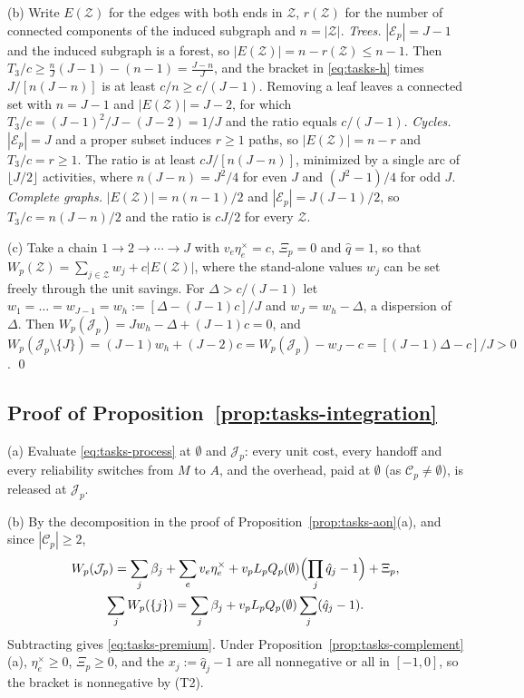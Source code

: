 (b) Write $E(\mathcal Z)$ for the edges with both ends in $\mathcal Z$, $r(\mathcal Z)$ for the number of connected components of the induced subgraph and $n=|\mathcal Z|$. \emph{Trees.} $|\mathcal E_p|=J-1$ and the induced subgraph is a forest, so $|E(\mathcal Z)|=n-r(\mathcal Z)\le n-1$. Then $T_3/c\ge\frac nJ(J-1)-(n-1)=\frac{J-n}J$, and the bracket in \eqref{eq:tasks-h} times $J/[n(J-n)]$ is at least $c/n\ge c/(J-1)$. Removing a leaf leaves a connected set with $n=J-1$ and $|E(\mathcal Z)|=J-2$, for which $T_3/c=(J-1)^2/J-(J-2)=1/J$ and the ratio equals $c/(J-1)$. \emph{Cycles.} $|\mathcal E_p|=J$ and a proper subset induces $r\ge 1$ paths, so $|E(\mathcal Z)|=n-r$ and $T_3/c=r\ge 1$. The ratio is at least $cJ/[n(J-n)]$, minimized by a single arc of $\lfloor J/2\rfloor$ activities, where $n(J-n)=J^2/4$ for even $J$ and $(J^2-1)/4$ for odd $J$. \emph{Complete graphs.} $|E(\mathcal Z)|=n(n-1)/2$ and $|\mathcal E_p|=J(J-1)/2$, so $T_3/c=n(J-n)/2$ and the ratio is $cJ/2$ for every $\mathcal Z$.

(c) Take a chain $1\to 2\to\cdots\to J$ with $v_e\eta^\times_e=c$, $\Xi_p=0$ and $\hat q=1$, so that $W_p(\mathcal Z)=\sum_{j\in\mathcal Z}w_j+c|E(\mathcal Z)|$, where the stand-alone values $w_j$ can be set freely through the unit savings. For $\Delta>c/(J-1)$ let $w_1=\dots=w_{J-1}=w_h:=[\Delta-(J-1)c]/J$ and $w_J=w_h-\Delta$, a dispersion of $\Delta$. Then $W_p(\mathcal J_p)=Jw_h-\Delta+(J-1)c=0$, and $W_p(\mathcal J_p\setminus\{J\})=(J-1)w_h+(J-2)c=W_p(\mathcal J_p)-w_J-c=[(J-1)\Delta-c]/J>0$. \qed

\subsection*{Proof of Proposition~\ref{prop:tasks-integration}}

(a) Evaluate \eqref{eq:tasks-process} at $\emptyset$ and $\mathcal J_p$: every unit cost, every handoff and every reliability switches from $M$ to $A$, and the overhead, paid at $\emptyset$ (as $\mathcal C_p\ne\emptyset$), is released at $\mathcal J_p$.

(b) By the decomposition in the proof of Proposition~\ref{prop:tasks-aon}(a), and since $|\mathcal C_p|\ge 2$,
\begin{gather*}
W_p(\mathcal J_p)=\sum_j\beta_j+\sum_ev_e\eta^\times_e+v_pL_pQ_p(\emptyset)\Bigl(\prod_j\hat q_j-1\Bigr)+\Xi_p,\\
\sum_jW_p(\{j\})=\sum_j\beta_j+v_pL_pQ_p(\emptyset)\sum_j(\hat q_j-1).
\end{gather*} Subtracting gives \eqref{eq:tasks-premium}. Under Proposition~\ref{prop:tasks-complement}(a), $\eta^\times_e\ge 0$, $\Xi_p\ge 0$, and the $x_j:=\hat q_j-1$ are all nonnegative or all in $[-1,0]$, so the bracket is nonnegative by (T2).

